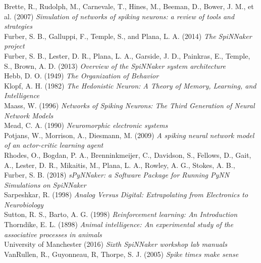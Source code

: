 \documentclass[10pt]{article}
\begin{document}
    \noindent 
    Brette, R., Rudolph, M., Carnevale, T., Hines, M., Beeman, D., Bower, J. M., et al. (2007) \textit{ Simulation of networks of spiking neurons: a review of tools and strategies} \\[-3pt]

    \noindent    
    Furber, S. B., Galluppi, F., Temple, S., and Plana, L. A. (2014) \textit{The SpiNNaker project} \\[-3pt]
    
    \noindent    
    Furber, S. B., Lester, D. R., Plana, L. A., Garside, J. D., Painkras, E., Temple, S., Brown, A. D. (2013) \textit{Overview of the SpiNNaker system architecture} \\[-3pt]

    \noindent
    Hebb, D. O. (1949) \textit{The Organization of Behavior} \\[-3pt]

    \noindent    
    Klopf, A. H. (1982) \textit{The Hedonistic Neuron: A Theory of Memory, Learning, and Intelligence} \\[-3pt]

    \noindent
    Maass, W. (1996) \textit{Networks of Spiking Neurons: The Third Generation of Neural Network Models} \\[-3pt]

    \noindent
    Mead, C. A. (1990) \textit{Neuromorphic electronic systems} \\[-3pt]

    \noindent
    Potjans, W., Morrison, A., Diesmann, M. (2009) \textit{A spiking neural network model of an actor-critic learning agent} \\[-3pt]

    \noindent
    Rhodes, O., Bogdan, P. A., Brenninkmeijer, C., Davidson, S., Fellows, D., Gait, A., Lester, D. R., Mikaitis, M., Plana, L. A., Rowley, A. G., Stokes, A. B., Furber, S. B. (2018) \textit{sPyNNaker: a Software Package for Running PyNN
    Simulations on SpiNNaker} \\[-3pt]

    \noindent
    Sarpeshkar, R. (1998) \textit{Analog Versus Digital: Extrapolating from Electronics to Neurobiology} \\[-3pt]

    \noindent
    Sutton, R. S., Barto, A. G. (1998) \textit{Reinforcement learning: An Introduction} \\[-3pt]

    \noindent
    Thorndike, E. L. (1898) \textit{Animal intelligence: An experimental study of the associative processes in animals} \\[-3pt]

    \noindent
    University of Manchester (2016) \textit{Sixth SpiNNaker workshop lab manuals} \\[-3pt]

    \noindent
    VanRullen, R., Guyonneau, R, Thorpe, S. J. (2005) \textit{Spike times make sense} \\[-3pt]
    
    
\end{document}
